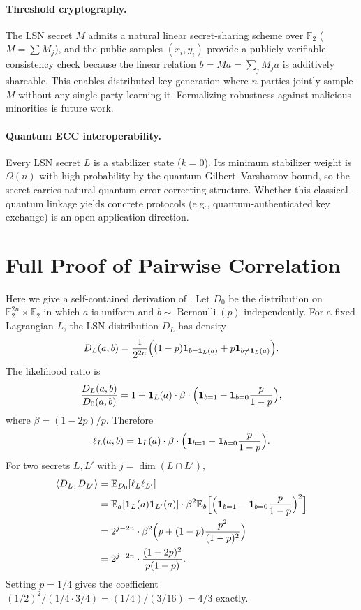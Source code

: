 \documentclass[11pt,a4paper]{article}
\theoremstyle{plain}
\theoremstyle{definition}
\newcommand{\F}{\mathbb{F}}
\newcommand{\E}{\mathbb{E}}
\begin{document}
\paragraph{Threshold cryptography.} The LSN secret $M$ admits a natural linear secret-sharing scheme over $\F_2$ ($M = \sum M_j$), and the public samples $(x_i,y_i)$ provide a publicly verifiable consistency check because the linear relation $b = Ma = \sum_j M_j a$ is additively shareable. This enables distributed key generation where $n$ parties jointly sample $M$ without any single party learning it. Formalizing robustness against malicious minorities is future work.

\paragraph{Quantum ECC interoperability.} Every LSN secret $L$ is a stabilizer state ($k=0$). Its minimum stabilizer weight is $\Omega(n)$ with high probability by the quantum Gilbert--Varshamov bound, so the secret carries natural quantum error-correcting structure. Whether this classical--quantum linkage yields concrete protocols (e.g., quantum-authenticated key exchange) is an open application direction.

\appendix

\section{Full Proof of Pairwise Correlation}
\label{app:corr}

Here we give a self-contained derivation of . Let $D_0$ be the distribution on $\F_2^{2n} \times \F_2$ in which $a$ is uniform and $b \sim \operatorname{Bernoulli}(p)$ independently. For a fixed Lagrangian $L$, the LSN distribution $D_L$ has density
\[
D_L(a,b) = \frac{1}{2^{2n}} \Bigl( (1-p)\mathbf{1}_{b=\mathbf{1}_L(a)} + p\mathbf{1}_{b \neq \mathbf{1}_L(a)} \Bigr).
\]
The likelihood ratio is
\[
\frac{D_L(a,b)}{D_0(a,b)} = 1 + \mathbf{1}_L(a) \cdot \beta \cdot \Bigl(\mathbf{1}_{b=1} - \mathbf{1}_{b=0}\frac{p}{1-p}\Bigr),
\]
where $\beta = (1-2p)/p$. Therefore
\[
\ell_L(a,b) = \mathbf{1}_L(a) \cdot \beta \cdot \Bigl(\mathbf{1}_{b=1} - \mathbf{1}_{b=0}\frac{p}{1-p}\Bigr).
\]
For two secrets $L,L'$ with $j = \dim(L \cap L')$,
\begin{align*}
\langle D_L, D_{L'} \rangle
&= \E_{D_0}[\ell_L \ell_{L'}] \\
&= \E_a[\mathbf{1}_L(a)\mathbf{1}_{L'}(a)] \cdot
   \beta^2 \E_b\Bigl[\Bigl(\mathbf{1}_{b=1} - \mathbf{1}_{b=0}\frac{p}{1-p}\Bigr)^2\Bigr] \\
&= 2^{j-2n} \cdot \beta^2 \Bigl( p + (1-p)\frac{p^2}{(1-p)^2} \Bigr) \\
&= 2^{j-2n} \cdot \frac{(1-2p)^2}{p(1-p)}.
\end{align*}
Setting $p=1/4$ gives the coefficient $(1/2)^2 / (1/4 \cdot 3/4) = (1/4)/(3/16) = 4/3$ exactly.
\end{document}
